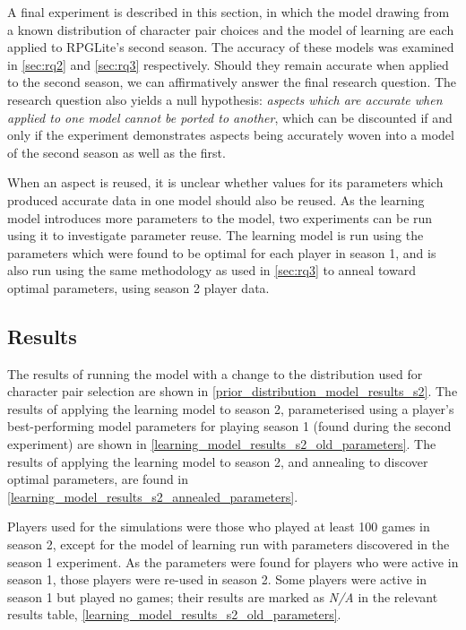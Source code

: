 A final experiment is described in this section, in which the model drawing from
a known distribution of character pair choices and the model of learning are
each applied to RPGLite's second season. The accuracy of these models was
examined in \cref{sec:rq2} and \cref{sec:rq3} respectively. Should they remain
accurate when applied to the second season, we can affirmatively answer the
final research question. The research question also yields a null hypothesis:
\emph{aspects which are accurate when applied to one model cannot be ported to
another}, which can be discounted if and only if the experiment
demonstrates aspects being accurately woven into a model of the second season as
well as the first. 

When an aspect is reused, it is unclear whether values for its parameters which
produced accurate data in one model should also be reused. As the learning model
introduces more parameters to the model, two experiments can be run using it to
investigate parameter reuse. The learning model is run using the parameters
which were found to be optimal for each player in season 1, and is also run
using the same methodology as used in \cref{sec:rq3} to anneal toward optimal
parameters, using season 2 player data.


\subsection{Results}

The results of running the model with a change to the distribution used for
character pair selection are shown in
\cref{prior_distribution_model_results_s2}. The results of applying the learning
model to season 2, parameterised using a player's best-performing model
parameters for playing season 1 (found during the second experiment) are shown
in \cref{learning_model_results_s2_old_parameters}. The results of applying the
learning model to season 2, and annealing to discover optimal parameters, are
found in \cref{learning_model_results_s2_annealed_parameters}.

Players used for the simulations were those who played at least 100 games in
season 2, except for the model of learning run with parameters discovered in the
season 1 experiment. As the parameters were found for players who were active in
season 1, those players were re-used in season 2. Some players were active in
season 1 but played no games; their results are marked as \emph{N/A} in the
relevant results table, \cref{learning_model_results_s2_old_parameters}.

